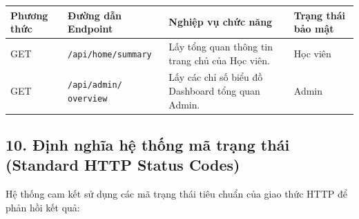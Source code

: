 \documentclass[12pt,a4paper]{article}
\makeatletter
\renewcommand{\_}{\BreakableUnderscore}
\newcommand{\tablecelllines}[1]{\begin{tabular}[t]{@{}l@{}}#1\end{tabular}}
\makeatother
\begin{document}
\begin{longtable}[]{
  |>{\raggedright\arraybackslash}p{}
  |>{\raggedright\arraybackslash}p{}
  |>{\raggedright\arraybackslash}p{}
  |>{\raggedright\arraybackslash}p{}|}
\hline\rowcolor{tableHeader}
\begin{minipage}[b]{\linewidth}\raggedright
Phương thức
\end{minipage} & \begin{minipage}[b]{\linewidth}\raggedright
Đường dẫn Endpoint
\end{minipage} & \begin{minipage}[b]{\linewidth}\raggedright
Nghiệp vụ chức năng
\end{minipage} & \begin{minipage}[b]{\linewidth}\raggedright
Trạng thái bảo mật
\end{minipage} \\
\hline
\endhead
\hline
\endlastfoot
GET & \texttt{/api/home/summary} & Lấy tổng quan thông tin trang chủ của Học viên. & Học viên \\
\hline
GET & \tablecelllines{\texttt{/api/admin/}\\\texttt{overview}} & Lấy các chỉ số biểu đồ Dashboard tổng quan Admin. & Admin \\
\hline
\end{longtable}

\subsection{10. Định nghĩa hệ thống mã trạng thái (Standard HTTP Status Codes)}

Hệ thống cam kết sử dụng các mã trạng thái tiêu chuẩn của giao thức HTTP để phản hồi kết quả:
\end{document}
